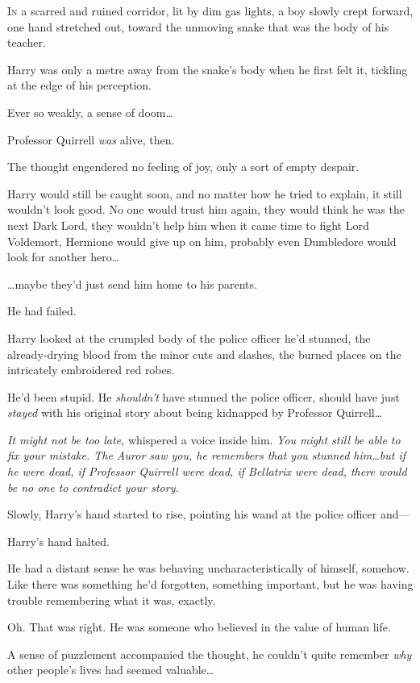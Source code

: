 
\lettrine{I}{n} a scarred and
ruined corridor, lit by dim gas lights, a boy slowly crept forward, one hand stretched out, toward the unmoving snake that was the body of his teacher.

Harry was only a metre away from the snake’s body when he first felt it, tickling at the edge of his perception.

Ever so weakly, a sense of doom…

Professor Quirrell \emph{was} alive, then.

The thought engendered no feeling of joy, only a sort of empty despair.

Harry would still be caught soon, and no matter how he tried to explain, it still wouldn’t look good. No one would trust him again, they would think he was the next Dark Lord, they wouldn’t help him when it came time to fight Lord Voldemort, Hermione would give up on him, probably even Dumbledore would look for another hero…

…maybe they’d just send him home to his parents.

He had failed.

Harry looked at the crumpled body of the police officer he’d stunned, the already-drying blood from the minor cuts and slashes, the burned places on the intricately embroidered red robes.

He’d been stupid. He \emph{shouldn’t} have stunned the police officer, should have just \emph{stayed} with his original story about being kidnapped by Professor Quirrell…

\emph{It might not be too late,} whispered a voice inside him. \emph{You might still be able to fix your mistake. The Auror saw you, he remembers that you stunned him…but if he were dead, if Professor Quirrell were dead, if Bellatrix were dead, there would be no one to contradict your story.}

Slowly, Harry’s hand started to rise, pointing his wand at the police officer and—

Harry’s hand halted.

He had a distant sense he was behaving uncharacteristically of himself, somehow. Like there was something he’d forgotten, something important, but he was having trouble remembering what it was, exactly.

Oh. That was right. He was someone who believed in the value of human life.

A sense of puzzlement accompanied the thought, he couldn’t quite remember \emph{why} other people’s lives had seemed valuable…

